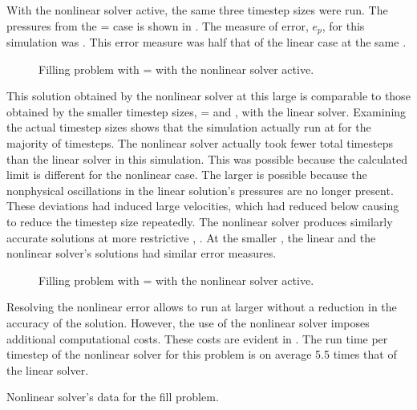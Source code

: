 With the nonlinear solver active, the same three timestep sizes were run.
The pressures from the \dtmax{} =  case is shown in .
The measure of error, $e_{p}$, for this simulation was .
This error measure was half that of the linear case at the same \dtmax{}.

\begin{figure}[h!t]
\centering

\caption{Filling problem with \dtmax{} =  with the nonlinear solver active.}
\label{fig:nlnFill1em1}
\end{figure}

This solution obtained by the nonlinear solver at this large \dtmax{} is comparable to those obtained by the smaller timestep sizes, \dtmax{} =  and , with the linear solver.
Examining the actual timestep sizes shows that the simulation actually run at \dtmax{} for the majority of timesteps.
The nonlinear solver actually took fewer total timesteps than the linear solver in this simulation.
This was possible because the calculated \dtcrnt{} limit is different for the nonlinear case.
The larger \dtcrnt{} is possible because the nonphysical oscillations in the linear solution's pressures are no longer present.
These deviations had induced large velocities, which had reduced \dtcrnt{} below \dtmax{} causing \cobra{} to reduce the timestep size repeatedly.
The nonlinear solver produces similarly accurate solutions at more restrictive \dtmax{}, .
At the smaller \dtmax{}, the linear and the nonlinear solver's solutions had similar error measures.

\begin{figure}[h!t]
\centering

\caption{Filling problem with \dtmax{} =  with the nonlinear solver active.}
\label{fig:nlnFill1pt6em3}
\end{figure}

Resolving the nonlinear error allows \cobra{} to run at larger \dt{} without a reduction in the accuracy of the solution.
However, the use of the nonlinear solver imposes additional computational costs.
These costs are evident in .
The run time per timestep of the nonlinear solver for this problem is on average 5.5 times that of the linear solver.

\begin{table}[ht]
\centering
\singlespace

\caption{Nonlinear solver's data for the fill problem.}
\label{tab:vmpNlnRunTime}
\end{table}

